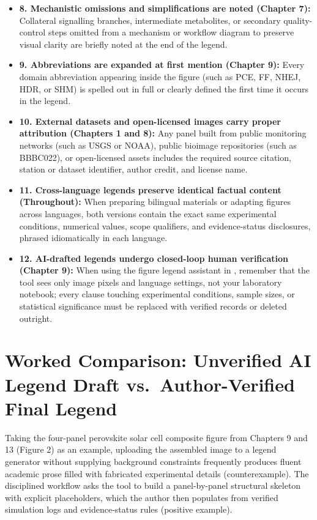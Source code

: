 \begin{itemize}
  \item[$\square$] \textbf{8. Mechanistic omissions and simplifications are noted (Chapter 7):} Collateral signalling branches, intermediate metabolites, or secondary quality-control steps omitted from a mechanism or workflow diagram to preserve visual clarity are briefly noted at the end of the legend.
  \item[$\square$] \textbf{9. Abbreviations are expanded at first mention (Chapter 9):} Every domain abbreviation appearing inside the figure (such as PCE, FF, NHEJ, HDR, or SHM) is spelled out in full or clearly defined the first time it occurs in the legend.
  \item[$\square$] \textbf{10. External datasets and open-licensed images carry proper attribution (Chapters 1 and 8):} Any panel built from public monitoring networks (such as USGS or NOAA), public bioimage repositories (such as BBBC022), or open-licensed assets includes the required source citation, station or dataset identifier, author credit, and license name.
  \item[$\square$] \textbf{11. Cross-language legends preserve identical factual content (Throughout):} When preparing bilingual materials or adapting figures across languages, both versions contain the exact same experimental conditions, numerical values, scope qualifiers, and evidence-status disclosures, phrased idiomatically in each language.
  \item[$\square$] \textbf{12. AI-drafted legends undergo closed-loop human verification (Chapter 9):} When using the figure legend assistant in \scidraw{}, remember that the tool sees only image pixels and language settings, not your laboratory notebook; every clause touching experimental conditions, sample sizes, or statistical significance must be replaced with verified records or deleted outright.
\end{itemize}

\section{Worked Comparison: Unverified AI Legend Draft vs.\ Author-Verified Final Legend}

Taking the four-panel perovskite solar cell composite figure from Chapters 9 and 13 (Figure 2) as an example, uploading the assembled image to a legend generator without supplying background constraints frequently produces fluent academic prose filled with fabricated experimental details (counterexample). The disciplined workflow asks the tool to build a panel-by-panel structural skeleton with explicit placeholders, which the author then populates from verified simulation logs and evidence-status rules (positive example).

